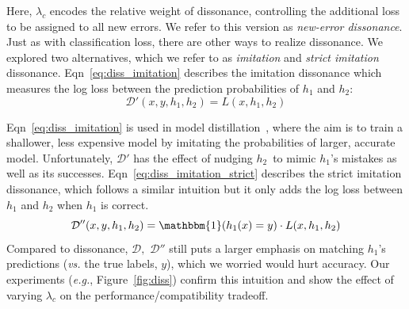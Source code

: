 \documentclass[letterpaper]{article}
\newcommand{\eg}{\mbox{\it e.g.}}
\newcommand{\hone}{\mbox{$h_1$}}
\newcommand{\htwo}{\mbox{$h_2$}}
\newcommand{\loss}{L}
\newcommand{\lambdabc}{\lambda_c}
\newcommand{\dissonance}{\mathcal{D}}
\begin{document}
\noindent Here, $\lambdabc$ encodes the relative weight of dissonance, controlling the additional loss to be assigned to all new errors.
We refer to this version as {\em new-error dissonance}.
Just as with classification loss, there are other ways to realize dissonance. We explored two alternatives, which we refer to as {\em imitation} and {\em strict imitation} dissonance.
Eqn~\ref{eq:diss_imitation} describes the imitation dissonance which measures the log loss between the prediction probabilities of $\hone$ and $\htwo$:
\begin{equation}
    \label{eq:diss_imitation}
    \dissonance'(x, y, \hone, \htwo) = \loss(x, \hone, \htwo)
\end{equation}

\noindent Eqn~\ref{eq:diss_imitation} is used in model distillation~\cite{ba2014deep,hinton2015distilling}, where the aim is to train a shallower, less expensive model by imitating the probabilities of larger, accurate model. Unfortunately, $\dissonance'$ has the effect of nudging \htwo\ to mimic \hone's mistakes as well as its successes.  
Eqn~\ref{eq:diss_imitation_strict} describes the strict imitation dissonance, which follows a similar intuition but it only adds the log loss between $\hone$ and $\htwo$ when $\hone$ is correct.
\begin{equation}
    \label{eq:diss_imitation_strict}
    \dissonance''(x, y, \hone, \htwo) = \mathbbm{1}(\hone(x) = y) \cdot \loss(x, \hone, \htwo)
\end{equation}
\noindent Compared to dissonance, $\dissonance,$  $\dissonance''$ still puts a larger emphasis on matching \hone's predictions ({\em vs.} the true labels, $y$), which we worried would hurt accuracy. Our experiments (\eg, Figure~\ref{fig:diss}) confirm this intuition and show the effect of varying
$\lambdabc$ on the performance/compatibility tradeoff. %
\end{document}
